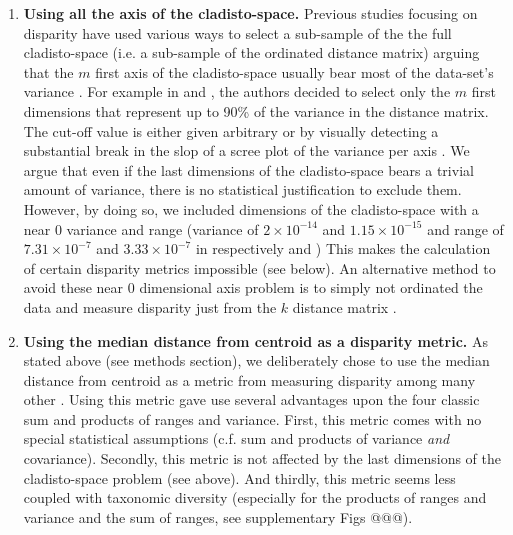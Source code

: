 \documentclass[12pt,letterpaper]{article}
\begin{document}
\begin{enumerate}
    \item \textbf{Using all the axis of the cladisto-space.}
    Previous studies focusing on disparity have used various ways to select a sub-sample of the the full cladisto-space (i.e. a sub-sample of the ordinated distance matrix) arguing that the $m$ first axis of the cladisto-space usually bear most of the data-set's variance \citep[e.g][]{brusatte50,cisneros2010,prentice2011,anderson2012using,Hughes20082013,bentonmodels2014}.
    For example in \cite{Brusatte12092008} and \cite{toljagictriassic-jurassic2013}, the authors decided to select only the $m$ first dimensions that represent up to 90\% of the variance in the distance matrix.
    The cut-off value is either given arbitrary or by visually detecting a substantial break in the slop of a scree plot of the variance per axis \citep{Wills1994}.
    We argue that even if the last dimensions of the cladisto-space bears a trivial amount of variance, there is no statistical justification to exclude them.
    However, by doing so, we included dimensions of the cladisto-space with a near 0 variance and range (variance of $2\times10^{-14}$ and $1.15\times10^{-15}$ and range of $7.31\times10^{-7}$ and $3.33\times10^{-7}$ in respectively \citealt{Slater2012MEE} and \citealt{beckancient2014})
    This makes the calculation of certain disparity metrics impossible (see below).
    An alternative method to avoid these near 0 dimensional axis problem is to simply not ordinated the data and measure disparity just from the $k$ distance matrix \citep[e.g.][]{bensonfaunal2014,Close2015}.
    \item \textbf{Using the median distance from centroid as a disparity metric.}    
    As stated above (see methods section), we deliberately chose to use the median distance from centroid as a metric from measuring disparity among many other \citep[e.g.][]{Wills1994,Ciampaglio2004,thorneresetting2011,hopkinsdecoupling2013,huang2015origins}.
    Using this metric gave use several advantages upon the four classic sum and products of ranges and variance.
    First, this metric comes with no special statistical assumptions (c.f. sum and products of variance \textit{and} covariance). %
    Secondly, this metric is not affected by the last dimensions of the cladisto-space problem (see above).
    And thirdly, this metric seems less coupled with taxonomic diversity (especially for the products of ranges and variance and the sum of ranges, see supplementary Figs @@@).

\end{enumerate}
\end{document}
